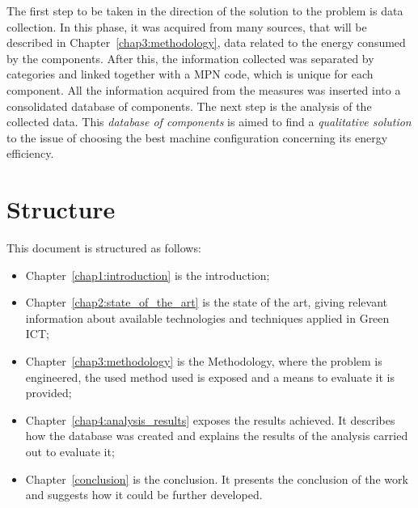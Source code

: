     The first step to be taken in the direction of the solution to the problem is data collection. In this phase, it was acquired from many sources, that will be described in Chapter~\ref{chap3:methodology}, data related to the energy consumed by the components. After this, the information collected was separated by categories and linked together with a MPN code, which is unique for each component. All the information acquired from the measures was inserted into a consolidated database of components. The next step is the analysis of the collected data. This \emph{database of components} is aimed to find a \emph{qualitative solution} to the issue of choosing the best machine configuration concerning its energy efficiency.

\section{Structure} \label{sec1:structure}

    This document is structured as follows:
    \begin{itemize}
        \item Chapter~\ref{chap1:introduction} is the introduction;
        \item Chapter~\ref{chap2:state_of_the_art} is the state of the art, giving relevant information about available technologies and techniques applied in Green ICT;
        \item Chapter~\ref{chap3:methodology} is the Methodology, where the problem is engineered, the used method used is exposed and a means to evaluate it is provided;
        \item Chapter~\ref{chap4:analysis_results} exposes the results achieved. It describes how the database was created and explains the results of the analysis carried out to evaluate it;
        \item Chapter~\ref{conclusion} is the conclusion. It presents the conclusion of the work and suggests how it could be further developed.
    \end{itemize}
    
    
